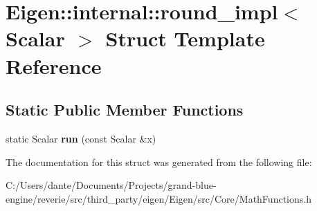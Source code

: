 \hypertarget{struct_eigen_1_1internal_1_1round__impl}{}\section{Eigen\+::internal\+::round\+\_\+impl$<$ Scalar $>$ Struct Template Reference}
\label{struct_eigen_1_1internal_1_1round__impl}
\subsection*{Static Public Member Functions}
\begin{DoxyCompactItemize}
\item 
\mbox{\label{struct_eigen_1_1internal_1_1round__impl_a76597be9d8fd901f20ff11c14824844c}} 
static Scalar {\bfseries run} (const Scalar \&x)
\end{DoxyCompactItemize}


The documentation for this struct was generated from the following file\+:\begin{DoxyCompactItemize}
\item 
C\+:/\+Users/dante/\+Documents/\+Projects/grand-\/blue-\/engine/reverie/src/third\+\_\+party/eigen/\+Eigen/src/\+Core/Math\+Functions.\+h\end{DoxyCompactItemize}
